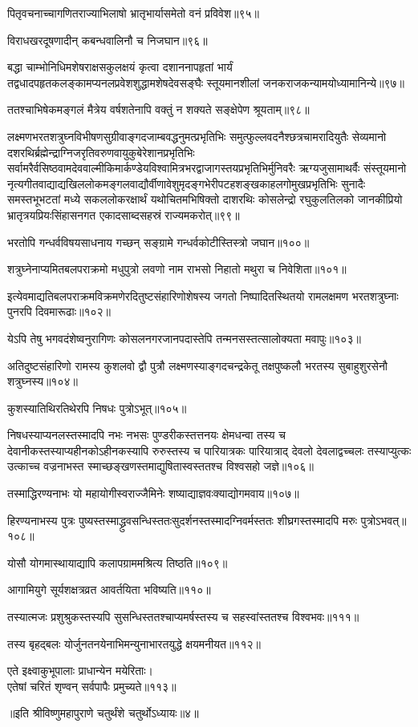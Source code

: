 \begin{flushleft}
पितृवचनाच्चागणितराज्याभिलाषो भ्रातृभार्यासमेतो वनं प्रविवेश॥९५॥

विराधखरदूषणादीन् कबन्धवालिनौ च निजघान॥९६॥

बद्धा चाम्भोनिधिमशेषराक्षसकुलक्षयं कृत्वा दशाननापहृतां भार्यं तद्वधादपहृतकलङ्कामप्यनलप्रवेशशुद्धामशेषदेवसङ्घैः स्तूयमानशीलां जनकराजकन्यामयोध्यामानिन्ये॥९७॥

ततश्चाभिषेकमङ्गलं मैत्रेय वर्षशतेनापि वक्तुं न शक्यते सङ्क्षेपेण श्रूयताम्॥९८॥

लक्ष्मणभरतशत्रुघ्नविभीषणसुग्रीवाङ्गदजाम्बवद्धनुमत्प्रभृतिभिः समुत्फुल्लवदनैश्छत्रचामरादियुतैः सेव्यमानो दशरथिर्ब्रह्मेन्द्राग्निजरृतिवरुणवायुकुबेरेशानप्रभृतिभिः सर्वामरैर्वसिष्ठ\-वामदेव\-वाल्मीकि\-मार्कण्डेय\-विश्वामित्र\-भरद्वाजागस्तय\-प्रभृतिभिर्मुनिवरैः ऋग्यजुसामाथर्वैः संस्तूयमानो नृत्यगीतवाद्याद्यखिललोकमङ्गलवाद्यौर्वीणावेशुमृदङ्गभेरी\-पटह\-शङ्ख\-काहल\-गोमुख\-प्रभृतिभिः सुनादैः समस्तभूभटतां मध्ये सकललोकरक्षार्थं यथोचितमभिषिक्तो दाशरथिः कोसलेन्द्रो रघुकुलतिलको जानकीप्रियो भ्रातृत्रयप्रियःसिंहासनगत एकादसाब्दसहस्रं राज्यमकरोत्॥९९॥

भरतोपि गन्धर्वविषयसाधनाय गच्छन् सङ्ग्रामे गन्धर्वकोटीस्तिस्त्रो जघान॥१००॥

शत्रुघ्नेनाप्यमितबलपराक्रमो मधुपुत्रो लवणो नाम राभसो निहातो मथुरा च निवेशिता॥१०१॥

इत्येवमाद्यतिबलपराक्रमविक्रमणेरदितुष्टसंहारिणोशेषस्य जगतो निष्पादितस्थितयो रामलक्षमण भरतशत्रुघ्नाः पुनरपि दिवमारूढाः॥१०२॥

येऽपि तेषु भगवदंशेष्वनुरागिणः कोसलनगरजानपदास्तेपि तन्मनसस्तत्सालोक्यता मवापुः॥१०३॥

अतिदुष्टसंहारिणो रामस्य कुशलवो द्वौ पुत्रौ लक्ष्मणस्याङ्गदचन्द्रकेतू तक्षपुष्कलौ भरतस्य सुबाहुशुरसेनौ शत्रुघ्नस्य॥१०४॥

कुशस्यातिथिरतिथेरपि निषधः पुत्रोऽभूत्॥१०५॥

निषधस्याप्यनलस्तस्मादपि नभः नभसः पुण्डरीकस्तत्तनयः क्षेमधन्वा तस्य च देवानीकस्तस्याप्यहीनकोऽहीनकस्यापि रुरुस्तस्य च पारियात्रकः पारियात्राद् देवलो देवलाद्वच्चलः तस्याप्युत्कः उत्काच्च वज्रनाभस्त स्माच्छङ्खणस्तमाद्युषितास्वस्ततश्च विश्वसहो जज्ञे॥१०६॥

तस्माद्धिरण्यनाभः यो महायोगीस्वराज्जैमिनेः शष्याद्याज्ञवःक्याद्योगमवाय॥१०७॥

हिरण्यनाभस्य पुत्रः पुष्यस्तस्माद्ध्रुवसन्धिस्ततःसुदर्शनस्तस्मादग्निवर्मस्ततः शीघ्रगस्तस्मादपि मरुः पुत्रोऽभवत्॥१०८॥

योसौ योगमास्थायाद्यापि कलापग्राममश्रित्य तिष्ठति॥१०९॥

आगामियुगे सूर्यशक्षत्रव्रत आवर्तयिता भविष्यति॥११०॥

तस्यात्मजः प्रशुश्रुकस्तस्यपि सुसन्धिस्ततश्चाप्यमर्षस्तस्य च सहस्वांस्ततश्च विश्वभवः॥१११॥

तस्य बृहद्बलः योर्जुनतनयेनाभिमन्युनाभारतयुद्धे क्षयमनीयत॥११२॥

एते इक्ष्वाकुभूपालाः प्राधान्येन मयेरिताः।\\
एतेषां चरितं शृण्वन् सर्वपापैः प्रमुच्यते॥११३॥

\end{flushleft}

॥इति श्रीविष्णुमहापुराणे चतुर्थंशे चतुर्थोऽध्यायः॥४॥
